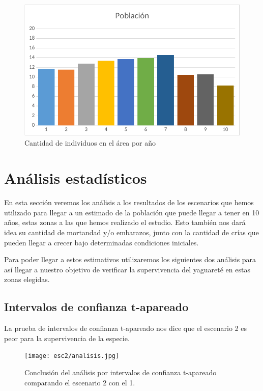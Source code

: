 \begin{figure}[!htb]
        \includegraphics[width=\linewidth]{images/esc3/densidad}
        \caption{Cantidad de individuos en el área por año}\label{fig:fig3-3}
        \endminipage
    \end{figure}

    \section{Análisis estadísticos}
        En esta sección veremos los análisis a los resultados de los escenarios que hemos utilizado para llegar a un
        estimado de la población que puede llegar a tener en 10 años, estas zonas a las que hemos realizado
        el estudio. Esto también nos dará idea su cantidad de mortandad y/o embarazos, junto con la cantidad de crías que
        pueden llegar a crecer bajo determinadas condiciones iniciales.

        Para poder llegar a estos estimativos utilizaremos los siguientes dos análisis para así llegar a nuestro objetivo de
        verificar la supervivencia del yaguareté en estas zonas elegidas.

        \subsection{Intervalos de confianza t-apareado}

            La prueba de intervalos de confianza t-apareado nos dice que el escenario 2 es peor para la supervivencia de la especie.

            \begin{figure}[htbp]
                \centering
                \texttt{[image: esc2/analisis.jpg]}
                \caption{Conclusión del análisis por intervalos de confianza t-apareado comparando el escenario 2 con el 1.}
                \label{fig:fig1}
            \end{figure}

